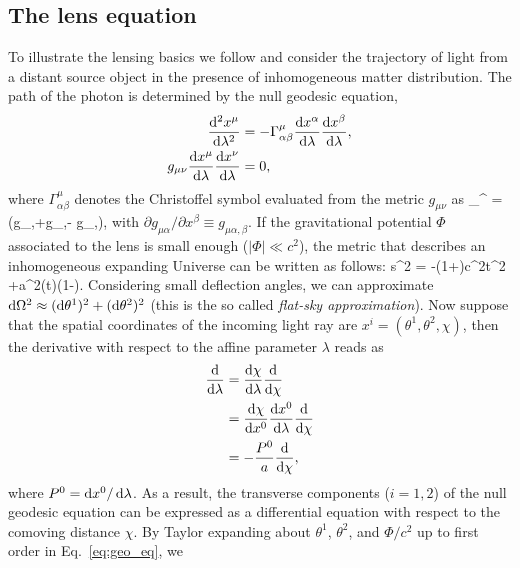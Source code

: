 \subsection{The lens equation}
\label{sec:lens_eq}
To illustrate the lensing basics we follow \cite{Shirasaki2016} and consider the trajectory of light from a 
distant source object in the presence of inhomogeneous matter distribution. The path of the photon is 
determined by the null geodesic equation,
%
\begin{align}
\label{eq:geo_eq}
\frac{\diff^2x^{\mu}}{\diff\lambda^2} &= -\Gamma_{\alpha\beta}^{\mu} \frac{\diff x^{\alpha}}{\diff\lambda}
\frac{\diff x^{\beta}}{\diff\lambda}, \\
g_{\mu\nu}\frac{\diff x^{\mu}}{\diff\lambda}\frac{\diff x^{\nu}}{\diff\lambda} &= 0, 
\end{align}
%
where $\Gamma_{\alpha\beta}^{\mu}$ denotes the Christoffel symbol evaluated from the metric 
$g_{\mu\nu}$ as 
%
\be
\Gamma_{\alpha\beta}^{\mu} =  (g_{\mu\alpha,\beta}+g_{\mu\beta,\alpha}-
g_{\alpha\beta,\mu}),
\ee
%
with $\partial g_{\mu\alpha}/\partial x^{\beta}\equiv g_{\mu\alpha,\beta}$. If the gravitational potential 
$\Phi$ associated to the lens is small enough ($|\Phi| \ll c^2$), the metric that describes an 
inhomogeneous expanding Universe can be written as follows:
%
\be
\diff s^2 = -\Bigl(1+\Bigr)c^2\diff t^2 +a^2(t)\Bigl(1-\Bigr).
\ee
%
Considering small deflection angles, we can approximate $\mathop{}\!\mathrm{d}\Omega^2 \approx (\mathop{}\!\mathrm{d}\theta^1)^2 +
(\mathop{}\!\mathrm{d}\theta^2)^2$ (this is the so called \emph{flat-sky approximation}). Now suppose that the spatial
coordinates of the incoming light ray are $x^i = (\theta^1,\theta^2,\chi)$, then the derivative with respect to
the affine parameter $\lambda$ reads as
%
\begin{align}
\frac{\diff}{\diff\lambda} &= \frac{\diff\chi}{\diff\lambda} \frac{\diff}{\diff\chi} \\
&= \frac{\diff\chi}{\diff x^0} \frac{\diff x^0}{\diff\lambda} \frac{\diff}{\diff\chi}\\
&= -\frac{P^0}{a} \frac{\diff}{\diff\chi},
\end{align}
%
where $P^0 = \mathop{}\!\mathrm{d} x^0/\mathop{}\!\mathrm{d}\lambda$. As a result, the transverse components ($i=1,2$) of the null geodesic 
equation can be expressed as a differential equation with respect to the comoving distance $\chi$. By
Taylor expanding about $\theta^1$, $\theta^2$, and $\Phi/c^2$ up to first order in Eq.~\eqref{eq:geo_eq}, we 
